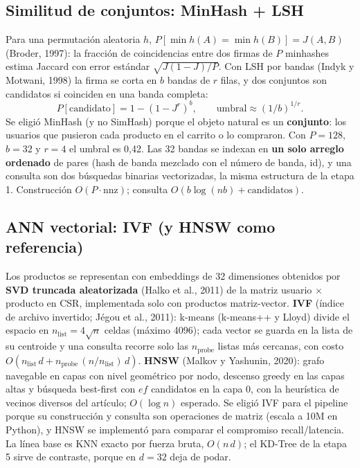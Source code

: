 \documentclass[11pt,letterpaper]{article}
\begin{document}
\subsection{Similitud de conjuntos: MinHash + LSH}

Para una permutación aleatoria $h$, $P[\min h(A) = \min h(B)] = J(A,B)$ (Broder, 1997): la fracción de coincidencias entre dos firmas de $P$ minhashes estima Jaccard con error estándar $\sqrt{J(1-J)/P}$. Con LSH por bandas (Indyk y Motwani, 1998) la firma se corta en $b$ bandas de $r$ filas, y dos conjuntos son candidatos si coinciden en una banda completa:
\[ P[\text{candidato}] = 1 - \left(1 - J^{r}\right)^{b}, \qquad \text{umbral} \approx (1/b)^{1/r}. \]
Se eligió MinHash (y no SimHash) porque el objeto natural es un \textbf{conjunto}: los usuarios que pusieron cada producto en el carrito o lo compraron. Con $P = 128$, $b = 32$ y $r = 4$ el umbral es 0{,}42. Las 32 bandas se indexan en \textbf{un solo arreglo ordenado} de pares (hash de banda mezclado con el número de banda, id), y una consulta son dos búsquedas binarias vectorizadas, la misma estructura de la etapa 1. Construcción $O(P \cdot \mathrm{nnz})$; consulta $O(b \log(nb) + \text{candidatos})$.

\subsection{ANN vectorial: IVF (y HNSW como referencia)}

Los productos se representan con embeddings de 32 dimensiones obtenidos por \textbf{SVD truncada aleatorizada} (Halko et al., 2011) de la matriz usuario $\times$ producto en CSR, implementada solo con productos matriz-vector. \textbf{IVF} (índice de archivo invertido; Jégou et al., 2011): k-means (k-means++ y Lloyd) divide el espacio en $n_\text{list} = 4\sqrt{n}$ celdas (máximo 4096); cada vector se guarda en la lista de su centroide y una consulta recorre solo las $n_\text{probe}$ listas más cercanas, con costo $O(n_\text{list}\,d + n_\text{probe}\,(n/n_\text{list})\,d)$. \textbf{HNSW} (Malkov y Yashunin, 2020): grafo navegable en capas con nivel geométrico por nodo, descenso greedy en las capas altas y búsqueda best-first con $ef$ candidatos en la capa 0, con la heurística de vecinos diversos del artículo; $O(\log n)$ esperado. Se eligió IVF para el pipeline porque su construcción y consulta son operaciones de matriz (escala a 10M en Python), y HNSW se implementó para comparar el compromiso recall/latencia. La línea base es KNN exacto por fuerza bruta, $O(n\,d)$; el KD-Tree de la etapa 5 sirve de contraste, porque en $d = 32$ deja de podar.
\end{document}
